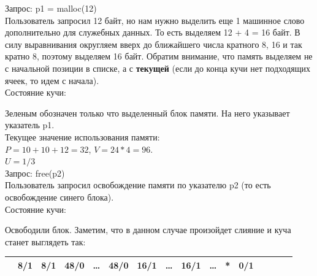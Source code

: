 \documentclass[12pt, letterpaper]{article}
\begin{document}
Запрос: p1 = malloc(12)\\
Пользователь запросил 12 байт, но нам нужно выделить еще 1 машинное слово дополнительно для служебных данных. То есть выделяем 12 + 4 = 16 байт. В силу выравнивания округляем вверх до ближайшего числа кратного 8, 16 и так кратно 8, поэтому выделяем 16 байт. Обратим внимание, что память выделяем не с начальной позиции в списке, а с \textbf{текущей} (если до конца кучи нет подходящих ячеек, то идем с начала).\\
Состояние кучи:
\begin{center}
\end{center}
Зеленым обозначен только что выделенный блок памяти. На него указывает указатель p1.\\
Текущее значение использования памяти:\\
$P=10 + 10 + 12 = 32$, $V=24 * 4 = 96$.\\ 
$U=1/3$\\

Запрос: free(p2)\\
Пользователь запросил освобождение памяти по указателю p2 (то есть освобождение синего блока).\\
Состояние кучи:
\begin{center}
\end{center}
Освободили блок. Заметим, что в данном случае произойдет слияние и куча станет выглядеть так:
\begin{center}
    \begin{tabular}{c*{15}{|c}}
        \hline
          &  8/1 &  8/1 & 48/0 & \dots & 48/0 &  16/1 &  \dots & 16/1&  \dots &  * & 0/1 \\
        \hline
    \end{tabular}
\end{center}
\end{document}
